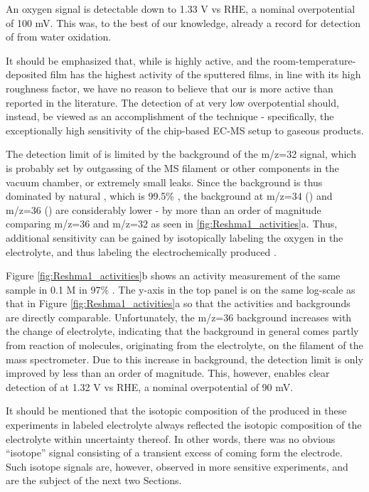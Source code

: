 An oxygen signal is detectable down to 1.33 V vs RHE, a nominal overpotential of 100 mV. This was, to the best of our knowledge, already a record for detection of  from water oxidation. 

It should be emphasized that, while  is highly active, and the room-temperature-deposited film has the highest activity of the sputtered films, in line with its high roughness factor, we have no reason to believe that our  is more active than  reported in the literature. The detection of  at very low overpotential should, instead, be viewed as an accomplishment of the technique - specifically, the exceptionally high sensitivity of the chip-based EC-MS setup to gaseous products.

The detection limit of  is limited by the background of the m/z=32 signal, which is probably set by outgassing of the MS filament or other components in the vacuum chamber, or extremely small leaks. Since the background is thus dominated by natural , which is 99.5\% , the background at m/z=34 () and m/z=36 () are considerably lower - by more than an order of magnitude comparing m/z=36 and m/z=32 as seen in \ref{fig:Reshma1_activities}a. Thus, additional sensitivity can be gained by isotopically labeling the oxygen in the electrolyte, and thus labeling the electrochemically produced .

Figure \ref{fig:Reshma1_activities}b shows an activity measurement of the same sample in 0.1 M  in 97\% . The y-axis in the top panel is on the same log-scale as that in Figure \ref{fig:Reshma1_activities}a so that the activities and backgrounds are directly comparable. Unfortunately, the m/z=36 background increases with the change of electrolyte, indicating that the  background in general comes partly from reaction of  molecules, originating from the electrolyte, on the filament of the mass spectrometer. Due to this increase in background, the  detection limit is only improved by less than an order of magnitude. This, however, enables clear detection of  at 1.32 V vs RHE, a nominal overpotential of 90 mV.

It should be mentioned that the isotopic composition of the  produced in these experiments in labeled electrolyte always reflected the isotopic composition of the electrolyte within uncertainty thereof. In other words, there was no obvious ``isotope'' signal consisting of a transient excess of  coming form the  electrode. Such isotope signals are, however, observed in more sensitive experiments, and are the subject of the next two Sections.

